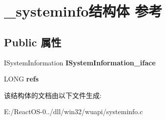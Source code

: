 \hypertarget{struct__systeminfo}{}\section{\+\_\+systeminfo结构体 参考}
\label{struct__systeminfo}
\subsection*{Public 属性}
\begin{DoxyCompactItemize}
\item 
\mbox{\label{struct__systeminfo_a43c56fc044a9bcf03ba503031ef8850e}} 
I\+System\+Information {\bfseries I\+System\+Information\+\_\+iface}
\item 
\mbox{\label{struct__systeminfo_ab135eea878d7fc11b57b9514b3fa3598}} 
L\+O\+NG {\bfseries refs}
\end{DoxyCompactItemize}


该结构体的文档由以下文件生成\+:\begin{DoxyCompactItemize}
\item 
E\+:/\+React\+O\+S-\/0../dll/win32/wuapi/systeminfo.\+c\end{DoxyCompactItemize}
